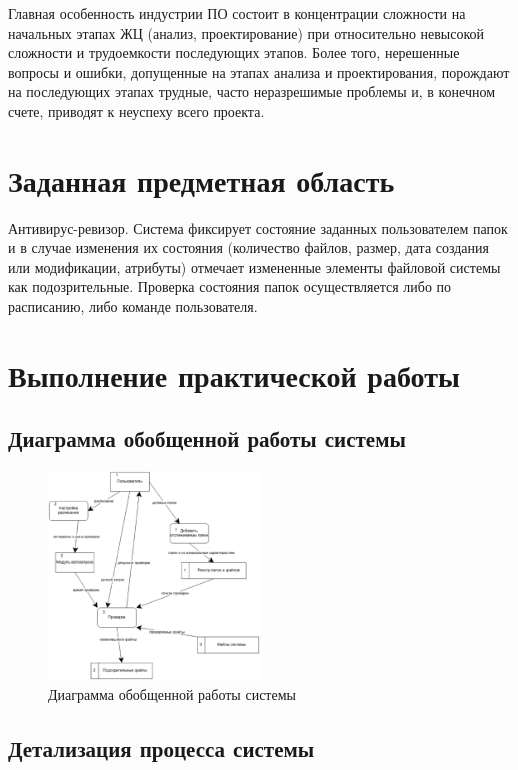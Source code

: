 Главная особенность индустрии ПО состоит в концентрации сложности на начальных этапах ЖЦ (анализ, проектирование) при относительно невысокой сложности и трудоемкости последующих этапов. Более того, нерешенные вопросы и ошибки, допущенные на этапах анализа и проектирования, порождают на последующих этапах трудные, часто неразрешимые проблемы и, в конечном счете, приводят к неуспеху всего проекта.
\section{Заданная предметная область}

Антивирус-ревизор. Система фиксирует состояние заданных пользователем папок и в случае изменения их состояния (количество файлов, размер, дата создания или модификации, атрибуты) отмечает измененные элементы файловой системы как подозрительные. Проверка состояния папок осуществляется либо по расписанию, либо команде пользователя.

\section{Выполнение практической работы}

\subsection{Диаграмма обобщенной работы системы}

\begin{figure}[h!]
	\centering
	\includegraphics[width=0.5\textwidth]{images/2/total.eps}
	\caption{Диаграмма обобщенной работы системы}
\end{figure}

\subsection{Детализация процесса системы}



